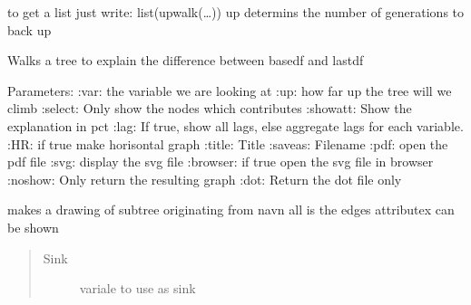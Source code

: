 \documentclass[letterpaper,10pt,english]{sphinxmanual}
\begin{document}
\begin{fulllineitems}
\begin{fulllineitems}
\sphinxAtStartPar
to get a list just write: list(upwalk(…))
up determins the number
of generations to back up

\end{fulllineitems}


\begin{fulllineitems}
\label{\detokenize{index:modelclass.Graph_Draw_Mixin.explain}}
\pysigstartsignatures
{}
\pysigstopsignatures
\sphinxAtStartPar
Walks a tree to explain the difference between basedf and lastdf

\sphinxAtStartPar
Parameters:
:var:  the variable we are looking at
:up:  how far up the tree will we climb
:select: Only show the nodes which contributes
:showatt: Show the explanation in pct
:lag:  If true, show all lags, else aggregate lags for each variable.
:HR: if true make horisontal graph
:title: Title
:saveas: Filename
:pdf: open the pdf file
:svg: display the svg file
:browser: if true open the svg file in browser
:noshow: Only return the resulting graph
:dot: Return the dot file only

\end{fulllineitems}


\begin{fulllineitems}
\label{\detokenize{index:modelclass.Graph_Draw_Mixin.todot}}
\pysigstartsignatures
{}
\pysigstopsignatures
\sphinxAtStartPar
makes a drawing of subtree originating from navn
all is the edges
attributex can be shown
\begin{quote}\begin{description}
\item[{Sink}] \leavevmode
\sphinxAtStartPar
variale to use as sink


\end{description}
\end{quote}
\end{fulllineitems}
\end{fulllineitems}
\end{document}
